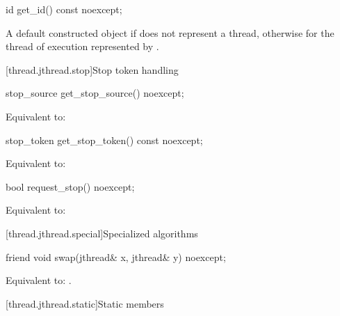 %
\begin{itemdecl}
id get_id() const noexcept;
\end{itemdecl}

\begin{itemdescr}
\pnum
\returns
A default constructed  object
if  does not represent a thread,
otherwise 
for the thread of execution represented by .
\end{itemdescr}

[thread.jthread.stop]{Stop token handling}

%
\begin{itemdecl}
stop_source get_stop_source() noexcept;
\end{itemdecl}

\begin{itemdescr}
\pnum
\effects
Equivalent to: 
\end{itemdescr}

%
\begin{itemdecl}
stop_token get_stop_token() const noexcept;
\end{itemdecl}

\begin{itemdescr}
\pnum
\effects
Equivalent to: 
\end{itemdescr}

%
\begin{itemdecl}
bool request_stop() noexcept;
\end{itemdecl}

\begin{itemdescr}
\pnum
\effects
Equivalent to: 
\end{itemdescr}


[thread.jthread.special]{Specialized algorithms}

%
\begin{itemdecl}
friend void swap(jthread& x, jthread& y) noexcept;
\end{itemdecl}

\begin{itemdescr}
\pnum
\effects
Equivalent to: .
\end{itemdescr}

[thread.jthread.static]{Static members}

